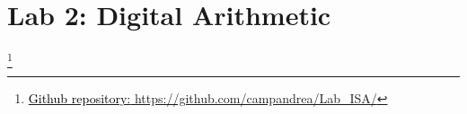 


\chapter{Lab 2: Digital Arithmetic}
{\let\thefootnote\relax\footnote{{\href{https://github.com/campandrea/Lab_ISA/}{\textcolor{black}{Github repository:} https://github.com/campandrea/Lab\_ISA/}}}}





